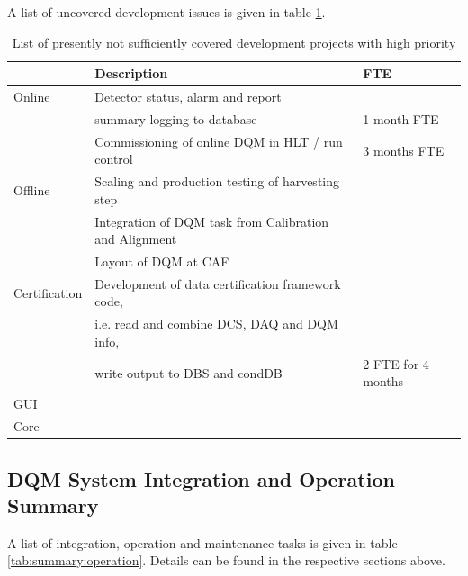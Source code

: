 \documentclass[a4paper]{cmspaper}
\begin{document}
A list of uncovered development issues is given in table \ref{tab:summary:devel}.

\begin{table}[h]
\begin{center}
\begin{tabular}{||l|l|l||}
\hline \hline
       & Description & FTE \\
       \hline
Online & Detector status, alarm and report & \\
       & summary logging to database & 1 month FTE \\
       & Commissioning of online DQM in HLT / run control & 3 months FTE \\
Offline & Scaling and production testing of harvesting step & \\ 
        & Integration of DQM task from Calibration and Alignment & \\ 
        & Layout of DQM at CAF & \\ 
Certification & Development of data certification framework code, & \\ 
         & i.e. read and combine DCS, DAQ and DQM info, & \\
	 & write output to DBS and condDB & 2 FTE for 4 months \\
GUI &  & \\
Core &  & \\
\hline \hline
\end{tabular}
\end{center}
\label{tab:summary:devel}
\caption{List of presently not sufficiently covered development projects with high priority}
\end{table}

\subsection{DQM System Integration and Operation Summary}

A list of integration, operation and maintenance tasks is given in table \ref{tab:summary:operation}.
Details can be found in the respective sections above.
\end{document}
